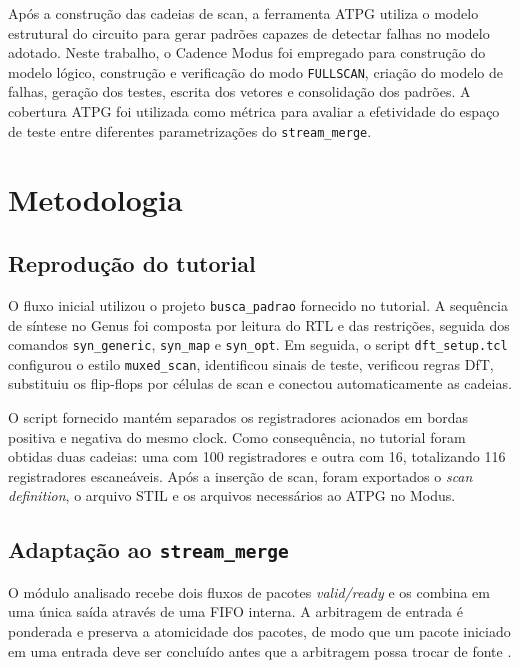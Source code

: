 \documentclass[conference]{IEEEtran}
\begin{document}
Após a construção das cadeias de scan, a ferramenta ATPG utiliza o modelo estrutural do circuito para gerar padrões capazes de detectar falhas no modelo adotado. Neste trabalho, o Cadence Modus foi empregado para construção do modelo lógico, construção e verificação do modo \texttt{FULLSCAN}, criação do modelo de falhas, geração dos testes, escrita dos vetores e consolidação dos padrões. A cobertura ATPG foi utilizada como métrica para avaliar a efetividade do espaço de teste entre diferentes parametrizações do \texttt{stream\_merge}.

\section{Metodologia}
\subsection{Reprodução do tutorial}

O fluxo inicial utilizou o projeto \texttt{busca\_padrao} fornecido no tutorial. A sequência de síntese no Genus foi composta por leitura do RTL e das restrições, seguida dos comandos \texttt{syn\_generic}, \texttt{syn\_map} e \texttt{syn\_opt}. Em seguida, o script \texttt{dft\_setup.tcl} configurou o estilo \texttt{muxed\_scan}, identificou sinais de teste, verificou regras DfT, substituiu os flip-flops por células de scan e conectou automaticamente as cadeias.

O script fornecido mantém separados os registradores acionados em bordas positiva e negativa do mesmo clock. Como consequência, no tutorial foram obtidas duas cadeias: uma com 100 registradores e outra com 16, totalizando 116 registradores escaneáveis. Após a inserção de scan, foram exportados o \textit{scan definition}, o arquivo STIL e os arquivos necessários ao ATPG no Modus.

\subsection{Adaptação ao \texttt{stream\_merge}}

O módulo analisado recebe dois fluxos de pacotes \textit{valid/ready} e os combina em uma única saída através de uma FIFO interna. A arbitragem de entrada é ponderada e preserva a atomicidade dos pacotes, de modo que um pacote iniciado em uma entrada deve ser concluído antes que a arbitragem possa trocar de fonte \cite{enunciado_t2}.
\end{document}
